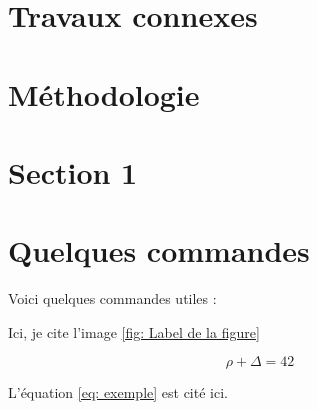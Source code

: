 \documentclass{rapportCS}
\begin{document}
\section{Travaux connexes}
\lipsum[1-2] 





\newpage

\section{Méthodologie}
\lipsum[2-3]





\newpage

\section{Section 1}




\section{Quelques commandes}

Voici quelques commandes utiles :


Ici, je cite l'image \ref{fig: Label de la figure}



\begin{equation} \label{eq: exemple}
\rho + \Delta = 42
\end{equation}

L'équation \ref{eq: exemple} est cité ici. 
\end{document}

